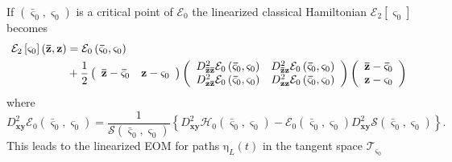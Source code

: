\documentclass[aps,preprint]{revtex4}%
\begin{document}
If $\left(  \mathbf{\bar{\varsigma}}_{0},\mathbf{\varsigma}_{0}\right)  $ is a
critical point of $\mathcal{E}_{0}$ the linearized classical Hamiltonian
$\mathcal{E}_{2}\left[  \mathbf{\varsigma}_{0}\right]  $ becomes
\begin{align}
\mathcal{E}_{2}\left[  \mathbf{\varsigma}_{0}\right]  \left(  \mathbf{\bar{z}%
},\mathbf{z}\right)   &  =\mathcal{E}_{0}\left(  \mathbf{\bar{\varsigma}}%
_{0},\mathbf{\varsigma}_{0}\right) \nonumber\\
&  +\frac{1}{2}\left(
\begin{array}
[c]{cc}%
\mathbf{\bar{z}}-\mathbf{\bar{\varsigma}}_{0} & \mathbf{z}-\mathbf{\varsigma
}_{0}%
\end{array}
\right)  \left(
\begin{array}
[c]{cc}%
D_{\mathbf{\bar{z}\bar{z}}}^{2}\mathcal{E}_{0}\left(  \mathbf{\bar{\varsigma}%
}_{0},\mathbf{\varsigma}_{0}\right)  & D_{\mathbf{\bar{z}z}}^{2}%
\mathcal{E}_{0}\left(  \mathbf{\bar{\varsigma}}_{0},\mathbf{\varsigma}%
_{0}\right) \\
D_{\mathbf{z\bar{z}}}^{2}\mathcal{E}_{0}\left(  \mathbf{\bar{\varsigma}}%
_{0},\mathbf{\varsigma}_{0}\right)  & D_{\mathbf{zz}}^{2}\mathcal{E}%
_{0}\left(  \mathbf{\bar{\varsigma}}_{0},\mathbf{\varsigma}_{0}\right)
\end{array}
\right)  \left(
\begin{array}
[c]{c}%
\mathbf{\bar{z}}-\mathbf{\bar{\varsigma}}_{0}\\
\mathbf{z}-\mathbf{\varsigma}_{0}%
\end{array}
\right)  \label{e2}%
\end{align}
where
\begin{equation}
D_{\mathbf{xy}}^{2}\mathcal{E}_{0}\left(  \mathbf{\bar{\varsigma}}%
_{0},\mathbf{\varsigma}_{0}\right)  =\frac{1}{\mathcal{S}\left(
\mathbf{\bar{\varsigma}}_{0},\mathbf{\varsigma}_{0}\right)  }\left\{
D_{\mathbf{xy}}^{2}\mathcal{H}_{0}\left(  \mathbf{\bar{\varsigma}}%
_{0},\mathbf{\varsigma}_{0}\right)  -\mathcal{E}_{0}\left(  \mathbf{\bar
{\varsigma}}_{0},\mathbf{\varsigma}_{0}\right)  D_{\mathbf{xy}}^{2}%
\mathcal{S}\left(  \mathbf{\bar{\varsigma}}_{0},\mathbf{\varsigma}_{0}\right)
\right\}  .
\end{equation}
This leads to the linearized EOM for paths $\mathrm{\eta}_{L}\left(  t\right)
$ in the tangent space $\mathcal{T}_{\mathbf{\varsigma}_{0}}$
\end{document}
